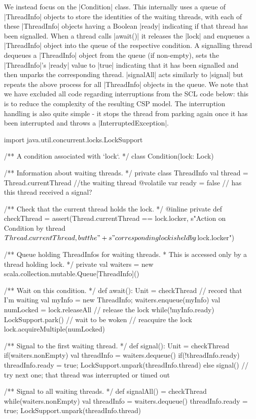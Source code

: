 We instead focus on the |Condition| class. This internally uses a queue of |ThreadInfo| objects to store the identities of the waiting threads, with each of these |ThreadInfo| objects having a Boolean |ready| indicating if that thread has been signalled. When a thread calls |await()| it releases the |lock| and enqueues a |ThreadInfo| object into the queue of the respective condition. A signalling thread dequeues a |ThreadInfo| object from the queue (if non-empty), sets the |ThreadInfo|'s |ready| value to |true| indicating that it has been signalled and then unparks the corresponding thread. |signalAll| acts similarly to |signal| but repeats the above process for all |ThreadInfo| objects in the queue. We note that we have excluded all code regarding interruptions from the SCL code below: this is to reduce the complexity of the resulting CSP model. The interruption handling is also quite simple - it stops the thread from parking again once it has been interrupted and throws a |InterruptedException|.

\begin{scala}[caption={A subset of the {\scalastyle Condition} class from \cite{GitHub}}, label={scala:Condition}]
import java.util.concurrent.locks.LockSupport

/** A condition associated with `lock`. */
class Condition(lock: Lock){
  /** Information about waiting threads. */
  private class ThreadInfo{
    val thread = Thread.currentThread //the waiting thread
    @volatile var ready = false // has this thread received a signal?
  }

  /** Check that the current thread holds the lock. */
  @inline private def checkThread = 
    assert(Thread.currentThread == lock.locker, 
      s"Action on Condition by thread ${Thread.currentThread}, but the "+
        s"corresponding lock is held by ${lock.locker}")

  /** Queue holding ThreadInfos for waiting threads.
    * This is accessed only by a thread holding lock. */
  private val waiters = new scala.collection.mutable.Queue[ThreadInfo]()

  /** Wait on this condition. */
  def await(): Unit = {
    checkThread
    // record that I'm waiting
    val myInfo = new ThreadInfo; waiters.enqueue(myInfo) 
    val numLocked = lock.releaseAll                 // release the lock
    while(!myInfo.ready){
      LockSupport.park()                            // wait to be woken
    }                              // reacquire the lock
    lock.acquireMultiple(numLocked)      
  }

  /** Signal to the first waiting thread. */
  def signal(): Unit = {
    checkThread
    if(waiters.nonEmpty){
      val threadInfo = waiters.dequeue()
      if(!threadInfo.ready){
        threadInfo.ready = true; LockSupport.unpark(threadInfo.thread)
      }
      else signal() // try next one; that thread was interrupted or timed out
    }      
  }

  /** Signal to all waiting threads. */
  def signalAll() = {
    checkThread
    while(waiters.nonEmpty){
      val threadInfo = waiters.dequeue()
      threadInfo.ready = true; LockSupport.unpark(threadInfo.thread)
    }      
  }
}
\end{scala}

